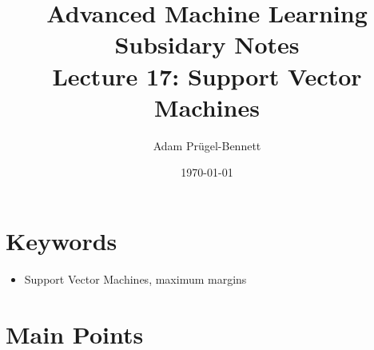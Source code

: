 \documentclass[11pt]{article}
\author{Adam Prügel-Bennett}
\date{\today}
\title{Advanced Machine Learning Subsidary Notes\\\medskip
\large Lecture 17: Support Vector Machines}
\begin{document}
\maketitle

\section{Keywords}
\label{sec:org370e376}
\begin{itemize}
\item Support Vector Machines, maximum margins
\end{itemize}

\section{Main Points}
\label{sec:org43b8030}
\end{document}
